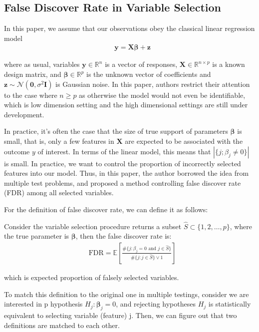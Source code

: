 \documentclass{uwstat572}
\begin{document}
\subsection{False Discover Rate in Variable Selection}
In this paper, we assume that our observations obey the classical linear regression model
\begin{align}
& \bm{y} = \bm{X}\bm{\beta}+\bm{z}
\end{align}

where as usual, variables $\bm{y}\in\mathbb{R}^n$ is a vector of responses, $\bm{X}\in \mathbb{R}^{n\times p}$ is a known design matrix, and $\bm{\beta}\in \mathbb{R}^p$ is the unknown vector of coefficients and $\bm{z}\sim \mathcal{N}(\bm{0}, \sigma^2\bm{I})$ is Gaussian noise. In this paper, authors restrict their attention to the case where $n\geq p$ as otherwise the model would not even be identifiable, which is low dimension setting and the high dimensional settings are still under development.

In practice, it's often the case that the size of true support of parameters $\bm{\beta}$ is small, that is, only a few features in $\bm{X}$ are expected to be associated with the outcome $y$ of interest. In terms of the linear model, this means that $|\{j; \beta_j \neq 0 \}|$ is small. In practice, we want to control the proportion of incorrectly selected features into our model. Thus, in this paper, the author borrowed the idea from multiple test problems, and proposed a method controlling false discover rate (FDR) among all selected variables.

For the definition of false discover rate, we can define it as follows:

\clearpage
{}

Consider the variable selection procedure returns a subset $\hat{S} \subset \{1,2,\dots, p \}$, where the true parameter is $\bm{\beta}$, then the false discover rate is:
\begin{align}
& \text{FDR} = \mathbb{E}\left[\frac{\#\{j:\beta_j = 0 \text{ and }j\in \hat{S} \} }{\#\{j: j\in \hat{S}\} \vee 1 } \right]
\end{align}

which is expected proportion of falsely selected variables. 

To match this definition to the original one in multiple testings, consider we are interested in p hypothesis $H_j: \bm{\beta}_j = 0$, and rejecting hypotheses $H_j$ is statistically equivalent to selecting variable (feature) j. Then, we can figure out that two definitions are matched to each other.
\end{document}
